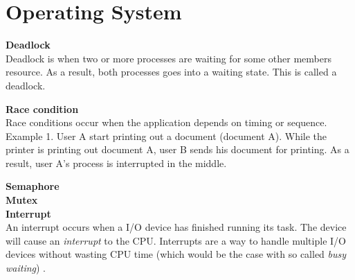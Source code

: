 \section{Operating System}
\textbf{Deadlock} \\
Deadlock is when two or more processes are waiting for some other members resource. As a result, both processes goes into a waiting state. This is called a deadlock. 

\textbf{Race condition} \\
Race conditions occur when the application depends on timing or sequence. \\ 
Example 1. User A start printing out a document (document A). While the printer is printing out document A, user B sends his document for printing. As a result, user A's process is interrupted in the middle. 

\textbf{Semaphore} \\

\textbf{Mutex} \\

\textbf{Interrupt} \\
An interrupt occurs when a I/O device has finished running its task. The device will cause an \textit{interrupt} to the CPU. Interrupts are a way to handle multiple I/O devices without wasting CPU time (which would be the case with so called \textit{busy waiting}) . 
